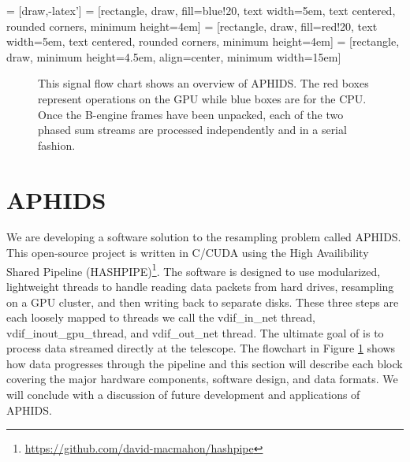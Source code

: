  = [draw,-latex']
 = [rectangle, draw, fill=blue!20,
    text width=5em, text centered, rounded corners, minimum height=4em]
 = [rectangle, draw, fill=red!20,
    text width=5em, text centered, rounded corners, minimum height=4em]
 = [rectangle, draw, minimum height=4.5em, align=center, minimum width=15em] 

\begin{figure}[t!]
\linespread{1.}\selectfont{}
\begin{center}
\caption{This signal flow chart shows an overview of APHIDS.  The red boxes represent operations on the GPU 
while blue boxes are for the CPU.  Once the B-engine frames have been unpacked, each of the two phased sum 
streams are processed independently and in a serial fashion.}
\label{fig:aphids_flow_chart}
\end{center}
\end{figure}

\section{APHIDS} \label{sec:aphids}

We are developing a software solution to the resampling problem called APHIDS.  This 
open-source project is written in C/CUDA using
the High Availibility Shared Pipeline 
(HASHPIPE)\footnote{\url{https://github.com/david-macmahon/hashpipe}}.  The software is designed to use 
modularized, lightweight threads to handle reading data packets from hard drives, resampling on a GPU cluster, 
and then writing back to separate disks.  These three steps are each loosely mapped to threads we call the 
vdif\_in\_net thread, vdif\_inout\_gpu\_thread, and vdif\_out\_net thread. 
The ultimate goal of is to process data streamed directly at the telescope.  The flowchart in Figure 
\ref{fig:aphids_flow_chart} shows how data progresses 
through the pipeline and this section will describe each block covering the major hardware components, software 
design, and data formats.  We will conclude with a discussion of future development and applications of APHIDS.


